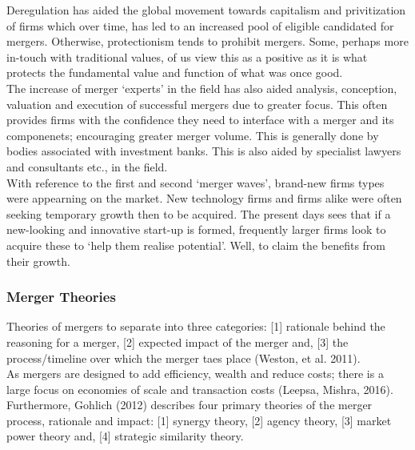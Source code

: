 \documentclass[11pt, english]{article}
\begin{document}
	Deregulation has aided the global movement towards capitalism and privitization of firms which over time, has led to an increased pool of eligible candidated for mergers. Otherwise, protectionism tends to prohibit mergers. Some, perhaps more in-touch with traditional values, of us view this as a positive as it is what protects the fundamental value and function of what was once good.\\

	The increase of merger `experts' in the field has also aided analysis, conception, valuation and execution of successful mergers due to greater focus. This often provides firms with the confidence they need to interface with a merger and its componenets; encouraging greater merger volume. This is generally done by bodies associated with investment banks. This is also aided by specialist lawyers and consultants etc., in the field.\\

	With reference to the first and second `merger waves', brand-new firms types were appearning on the market. New technology firms and firms alike were often seeking temporary growth then to be acquired. The present days sees that if a new-looking and innovative start-up is formed, frequently larger firms look to acquire these to `help them realise potential'. Well, to claim the benefits from their growth.

		\subsubsection*{Merger Theories}

	Theories of mergers to separate into three categories: [1] rationale behind the reasoning for a merger, [2] expected impact of the merger and, [3] the process/timeline over which the merger taes place (Weston, et al. 2011).\\

	As mergers are designed to add efficiency, wealth and reduce costs; there is a large focus on economies of scale and transaction costs (Leepsa, Mishra, 2016).\\

	Furthermore, Gohlich (2012) describes four primary theories of the merger process, rationale and impact: [1] synergy theory, [2] agency theory, [3] market power theory and, [4] strategic similarity theory.\\
\end{document}
